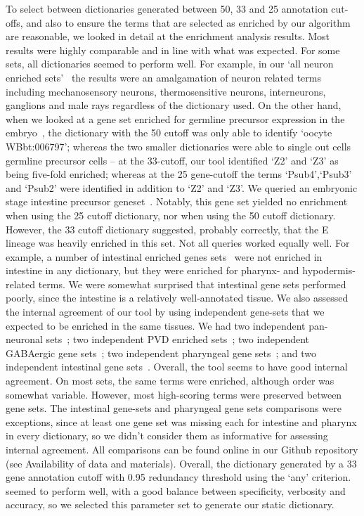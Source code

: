 \documentclass[linenumbers, doublespacing]{bmcart}
\begin{document}
	To select between dictionaries generated between 50, 33 and 25 annotation cut-offs, and also to ensure the terms that are selected as enriched by our algorithm are reasonable, we looked in detail at the enrichment analysis results. 
	Most results were highly comparable and in line with what was expected. For some sets, all dictionaries seemed to perform well. For example, in our `all neuron enriched sets'~\cite{Spencer2011, Watson2008a} the results were an amalgamation of neuron related terms including mechanosensory neurons, thermosensitive neurons, interneurons, ganglions and male rays regardless of the dictionary used. On the other hand, when we looked at a gene set enriched for germline precursor expression in the embryo~\cite{Spencer2011}, the dictionary with the 50 cutoff was only able to identify `oocyte WBbt:006797'; whereas the two smaller dictionaries were able to single out cells germline precursor cells -- at the 33-cutoff, our tool identified `Z2' and `Z3' as being five-fold enriched; whereas at the 25 gene-cutoff the terms `Psub4',`Psub3' and `Psub2' were identified in addition to `Z2' and `Z3'.
	We queried an embryonic stage intestine precursor geneset~\cite{Spencer2011}. Notably, this gene set yielded no enrichment when using the 25 cutoff dictionary, nor when using the 50 cutoff dictionary. However, the 33 cutoff dictionary suggested, probably correctly, that the E lineage was heavily enriched in this set. 
	Not all queries worked equally well. For example, a number of intestinal enriched genes sets~\cite{Spencer2011, Pauli2006} were not enriched in intestine in any dictionary, but they were enriched for pharynx- and hypodermis-related terms. We were somewhat surprised that intestinal gene sets performed poorly, since the intestine is a relatively well-annotated tissue.
	We also assessed the internal agreement of our tool by using independent gene-sets that we expected to be enriched in the same tissues. We had two independent pan-neuronal sets~\cite{Spencer2011, Watson2008a}; two independent PVD enriched sets~\cite{Spencer2011, Smith2010}; two independent GABAergic gene sets~\cite{Spencer2011, Cinar2005}; two independent pharyngeal gene sets~\cite{Spencer2011, Gaudet2004}; and two independent intestinal gene sets~\cite{Spencer2011, Pauli2006}. Overall, the tool seems to have good internal agreement. On most sets, the same terms were enriched, although order was somewhat variable. However, most high-scoring terms were preserved between gene sets. The intestinal gene-sets and pharyngeal gene sets comparisons were exceptions, since at least one gene set was missing each for intestine and pharynx in every dictionary, so we didn't consider them as informative for assessing internal agreement. 
	 All comparisons can be found online in our Github repository (see Availability of data and materials). Overall, the dictionary generated by a 33 gene annotation cutoff with 0.95 redundancy threshold using the `any' criterion. seemed to perform well, with a good balance between specificity, verbosity and accuracy, so we selected this parameter set to generate our static dictionary. 
	
\end{document}
